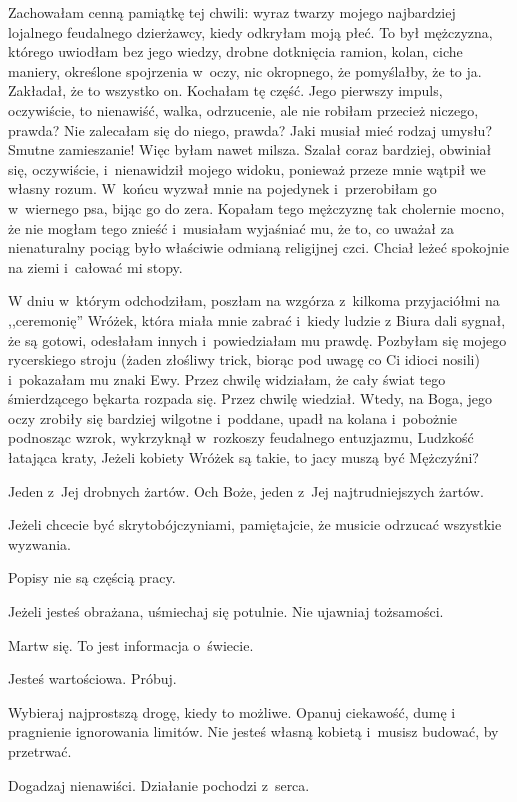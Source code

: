 \documentclass[oneside,polish,12pt,sfheadings]{mwbk}
\begin{document}
Zachowałam cenną pamiątkę tej chwili: wyraz twarzy mojego najbardziej
lojalnego feudalnego dzierżawcy, kiedy odkryłam moją płeć. To był
mężczyzna, którego uwiodłam bez jego wiedzy, drobne dotknięcia ramion,
kolan, ciche maniery, określone spojrzenia w~oczy, nic okropnego,
że pomyślałby, że to ja. Zakładał, że to wszystko on. Kochałam tę
część. Jego pierwszy impuls, oczywiście, to nienawiść, walka, odrzucenie,
ale nie robiłam przecież niczego, prawda? Nie zalecałam się do niego,
prawda? Jaki musiał mieć rodzaj umysłu? Smutne zamieszanie! Więc byłam
nawet milsza. Szalał coraz bardziej, obwiniał się, oczywiście, i~nienawidził
mojego widoku, ponieważ przeze mnie wątpił we własny rozum. W~końcu
wyzwał mnie na pojedynek i~przerobiłam go w~wiernego psa, bijąc go
do zera. Kopałam tego mężczyznę tak cholernie mocno, że nie mogłam
tego znieść i~musiałam wyjaśniać mu, że to, co uważał za nienaturalny
pociąg było właściwie odmianą religijnej czci. Chciał leżeć spokojnie
na ziemi i~całować mi stopy.

W dniu w~którym odchodziłam, poszłam na wzgórza z~kilkoma przyjaciółmi
na ,,ceremonię'' Wróżek, która miała mnie zabrać i~kiedy ludzie z
Biura dali sygnał, że są gotowi, odesłałam innych i~powiedziałam mu
prawdę. Pozbyłam się mojego rycerskiego stroju (żaden złośliwy trick,
biorąc pod uwagę co Ci idioci nosili) i~pokazałam mu znaki Ewy. Przez
chwilę widziałam, że cały świat tego śmierdzącego bękarta rozpada
się. Przez chwilę wiedział. Wtedy, na Boga, jego oczy zrobiły się
bardziej wilgotne i~poddane, upadł na kolana i~pobożnie podnosząc
wzrok, wykrzyknął w~rozkoszy feudalnego entuzjazmu, Ludzkość łatająca
kraty, Jeżeli kobiety Wróżek są takie, to jacy muszą być Mężczyźni?

Jeden z~Jej drobnych żartów. Och Boże, jeden z~Jej najtrudniejszych
żartów.

Jeżeli chcecie być skrytobójczyniami, pamiętajcie, że musicie odrzucać
wszystkie wyzwania.

Popisy nie są częścią pracy.

Jeżeli jesteś obrażana, uśmiechaj się potulnie. Nie ujawniaj tożsamości.

Martw się. To jest informacja o~świecie.

Jesteś wartościowa. Próbuj.

Wybieraj najprostszą drogę, kiedy to możliwe. Opanuj ciekawość, dumę
i pragnienie ignorowania limitów. Nie jesteś własną kobietą i~musisz
budować, by przetrwać.

Dogadzaj nienawiści. Działanie pochodzi z~serca.
\end{document}
